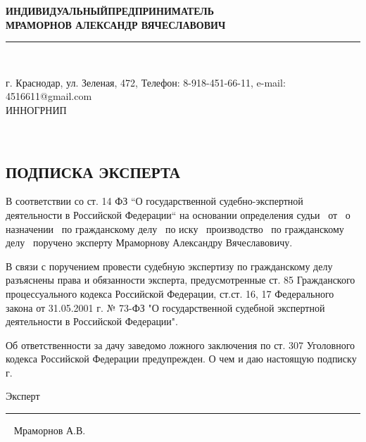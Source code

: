 \setcounter{page}{1}
\pagestyle{empty} %

%
%
\begin{center}
	\large\textbf{ИНДИВИДУАЛЬНЫЙ\quad ПРЕДПРИНИМАТЕЛЬ  \\[-1.5mm] МРАМОРНОВ  АЛЕКСАНДР ВЯЧЕСЛАВОВИЧ \\[-5.5mm]}
	\noindent\rule{\textwidth}{2pt}\\[-6mm]  %
\end{center}

\begin{center}
	\begin{footnotesize}
		\vspace{-2.5mm}г. Краснодар,
		ул. Зеленая, 472, 
		Телефон: 8-918-451-66-11, e-mail: 4516611@gmail.com\\ [-2mm]{ИНН\quad ОГРНИП \quad 310231220400043}
	\end{footnotesize}	\\[6mm]
\end{center}




\begin{center}
	\section{{\Large \textbf{ПОДПИСКА      ЭКСПЕРТА}}}
\end{center}




В соответствии со ст. 14  ФЗ “О государственной судебно-экспертной деятельности в Российской Федерации“ на основании определения судьи \sud \,  от \dataopr  \, о назначении \opr \, по гражданскому делу \delonum \, по иску \isk \,  производство \opr \, по гражданскому делу \delonum \, поручено эксперту   Мраморнову Александру Вячеславовичу. 

\vspace{5mm}

В связи с поручением провести судебную экспертизу по гражданскому делу \delonum \, разъяснены права и обязанности эксперта, предусмотренные ст. 85 Гражданского процессуального кодекса Российской Федерации, ст.ст. 16, 17 Федерального закона от 31.05.2001 г. № 73-ФЗ "О государственной судебной экспертной деятельности в Российской Федерации". 

Об ответственности за дачу заведомо ложного заключения по ст. 307 Уголовного кодекса Российской Федерации предупрежден.  
О  чем и даю настоящую подписку \datastart г.





\vspace{30mm}

{Эксперт}\hfill      \rule{4cm}{0.1 mm} \,\,\,      {Мраморнов А.В.}